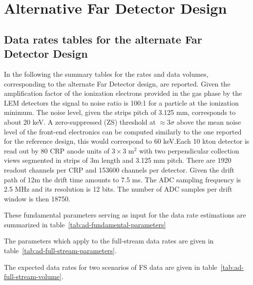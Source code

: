 \chapter{Alternative Far Detector Design}
\label{ch:alt-annex-rate}

\section{Data rates tables for the alternate Far Detector Design}

In the following the summary tables for the rates and data volumes, corresponding to the alternate Far Detector design, are reported.
Given the amplification factor of the ionization electrons provided in the gas phase by the LEM detectors the signal to noise ratio is 100:1
for a particle at the ionization minimum. The noise level, given the strips pitch of 3.125 mm, corresponds to about 20 keV. 
A zero-suppressed (ZS) threshold at $\approx 3\sigma$ above the mean noise level of the front-end electronics can be computed similarly to the 
one reported for the reference design, this would correspond to 60 keV.Each 10 kton detector is read out by
80 CRP anode units of $3 \times 3$ m$^2$ with two perpendicular collection views segmented in strips of 3m length and 3.125 mm pitch. 
There are 1920 readout channels per CRP and 153600 channels per detector. Given the drift path of 12m the drift time amounts to 7.5 ms.  The ADC sampling frequency is 2.5 MHz and its resolution is 12 bits. The number of ADC samples per drift window is then 18750.

These fundamental parameters serving as input for the data rate estimations are summarized in table~\ref{tab:ad-fundamental-parameters}




The parameters which apply to the full-stream data rates are given in table~\ref{tab:ad-full-stream-parameters}.



The expected data rates for two scenarios of FS data are given in table~\ref{tab:ad-full-stream-volume}.


